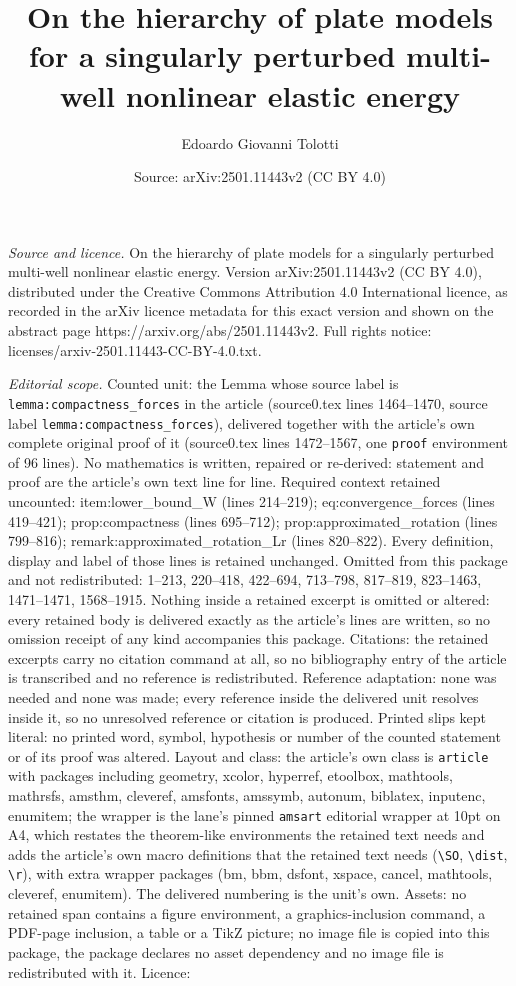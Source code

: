 \documentclass[10pt,a4paper]{amsart}
\title[On the hierarchy of plate models for a singularly perturbed ]{On the hierarchy of plate models for a singularly perturbed multi-well nonlinear elastic energy}
\author{Edoardo Giovanni Tolotti}
\date{Source: arXiv:2501.11443v2 (CC BY 4.0)}
\begin{document}
\maketitle

\noindent\emph{Source and licence.} On the hierarchy of plate models for a singularly perturbed multi-well nonlinear elastic energy. Version arXiv:2501.11443v2 (CC BY 4.0), distributed under the Creative Commons Attribution 4.0 International licence, as recorded in the arXiv licence metadata for this exact version and shown on the abstract page https://arxiv.org/abs/2501.11443v2. Full rights notice: licenses/arxiv-2501.11443-CC-BY-4.0.txt.\par\smallskip

\noindent\textit{Editorial scope.} Counted unit: the Lemma whose source label is \texttt{lemma:compactness\_forces} in the article (source0.tex lines 1464--1470, source label \texttt{lemma:compactness\_forces}), delivered together with the article's own complete original proof of it (source0.tex lines 1472--1567, one \texttt{proof} environment of 96 lines). No mathematics is written, repaired or re-derived: statement and proof are the article's own text line for line. Required context retained uncounted: item:lower\_bound\_W (lines 214--219); eq:convergence\_forces (lines 419--421); prop:compactness (lines 695--712); prop:approximated\_rotation (lines 799--816); remark:approximated\_rotation\_Lr (lines 820--822). Every definition, display and label of those lines is retained unchanged. Omitted from this package and not redistributed: 1--213, 220--418, 422--694, 713--798, 817--819, 823--1463, 1471--1471, 1568--1915. Nothing inside a retained excerpt is omitted or altered: every retained body is delivered exactly as the article's lines are written, so no omission receipt of any kind accompanies this package. Citations: the retained excerpts carry no citation command at all, so no bibliography entry of the article is transcribed and no reference is redistributed. Reference adaptation: none was needed and none was made; every reference inside the delivered unit resolves inside it, so no unresolved reference or citation is produced. Printed slips kept literal: no printed word, symbol, hypothesis or number of the counted statement or of its proof was altered. Layout and class: the article's own class is \texttt{article} with packages including geometry, xcolor, hyperref, etoolbox, mathtools, mathrsfs, amsthm, cleveref, amsfonts, amssymb, autonum, biblatex, inputenc, enumitem; the wrapper is the lane's pinned \texttt{amsart} editorial wrapper at 10pt on A4, which restates the theorem-like environments the retained text needs and adds the article's own macro definitions that the retained text needs (\texttt{\textbackslash SO}, \texttt{\textbackslash dist}, \texttt{\textbackslash r}), with extra wrapper packages (bm, bbm, dsfont, xspace, cancel, mathtools, cleveref, enumitem). The delivered numbering is the unit's own. Assets: no retained span contains a figure environment, a graphics-inclusion command, a PDF-page inclusion, a table or a TikZ picture; no image file is copied into this package, the package declares no asset dependency and no image file is redistributed with it. Licence: 
\end{document}
